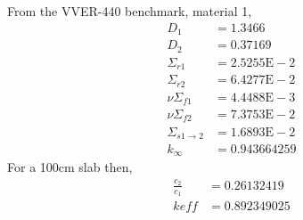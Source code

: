   From the VVER-440 benchmark, material 1,
  \begin{align*}
    D_1 &= 1.3466  \\
    D_2 &= 0.37169 \\
    \Sigma_{r1} &= 2.5255\text{E}-2\\
    \Sigma_{r2} &= 6.4277\text{E}-2\\
    \nu \Sigma_{f1}  &= 4.4488\text{E}-3\\
    \nu \Sigma_{f2}  &= 7.3753\text{E}-2\\
    \Sigma_{s1\rightarrow2} &= 1.6893\text{E}-2 \\
    k_{\infty} &= 0.943664259
  \end{align*}
  For a 100cm slab then,
  \begin{align*}
    \frac{c_2}{c_1} &= 0.26132419 \\
    keff &= 0.892349025
  \end{align*}
